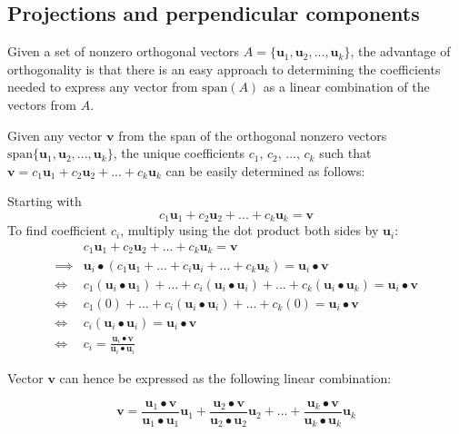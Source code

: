 \documentclass{article}
\begin{document}
\subsection*{Projections and perpendicular components}

Given a set of nonzero orthogonal vectors \(A = \{\mathbf{u}_1, \mathbf{u}_2, ..., \mathbf{u}_k\}\), the advantage of orthogonality is that there is an easy approach to determining the coefficients needed to express any vector from \(\text{span}(A)\) as a linear combination of the vectors from \(A\). 

Given any vector \(\mathbf{v}\) from the span of the orthogonal nonzero vectors \(\text{span}\{\mathbf{u}_1, \mathbf{u}_2, ..., \mathbf{u}_k\}\), the unique coefficients \(c_1\), \(c_2\), ..., \(c_k\) such that \(\mathbf{v} = c_1 \mathbf{u}_1 + c_2\mathbf{u}_2 + ... + c_k\mathbf{u}_k\) can be easily determined as follows:

Starting with 
\[c_1 \mathbf{u}_1 + c_2\mathbf{u}_2 + ... + c_k\mathbf{u}_k = \mathbf{v}\]
To find coefficient \(c_i\), multiply using the dot product both sides by \(\mathbf{u}_i\):
\begin{align*}
& c_1 \mathbf{u}_1 + c_2\mathbf{u}_2 + ... + c_k\mathbf{u}_k = \mathbf{v} \\
\implies & \mathbf{u}_i \bullet (c_1 \mathbf{u}_1 + ... + c_i\mathbf{u}_i + ... + c_k\mathbf{u}_k) = \mathbf{u}_i \bullet \mathbf{v} \\
\iff & c_1(\mathbf{u}_ i \bullet \mathbf{u}_1) + ... + c_i(\mathbf{u}_i \bullet \mathbf{u}_i) + ... + c_k(\mathbf{u}_i \bullet \mathbf{u}_k) = \mathbf{u}_i \bullet \mathbf{v} \\
\iff & c_1(0) + ... + c_i(\mathbf{u}_i \bullet \mathbf{u}_i) + ... + c_k(0) = \mathbf{u}_i \bullet \mathbf{v} \\
\iff & c_i(\mathbf{u}_i \bullet \mathbf{u}_i) = \mathbf{u}_i \bullet \mathbf{v} \\
\iff & c_i = \frac{\mathbf{u}_i \bullet \mathbf{v}}{\mathbf{u}_i \bullet \mathbf{u}_i}
\end{align*}

Vector \(\mathbf{v}\) can hence be expressed as the following linear combination:

\[\mathbf{v} = \frac{\mathbf{u}_1 \bullet \mathbf{v}}{\mathbf{u}_1 \bullet \mathbf{u}_1}\mathbf{u}_1 + \frac{\mathbf{u}_2 \bullet \mathbf{v}}{\mathbf{u}_2 \bullet \mathbf{u}_2}\mathbf{u}_2 + ... + \frac{\mathbf{u}_k \bullet \mathbf{v}}{\mathbf{u}_k \bullet \mathbf{u}_k}\mathbf{u}_k\]
\end{document}
